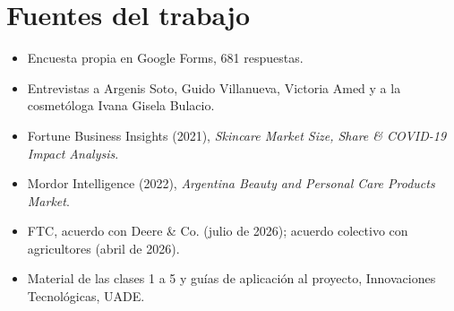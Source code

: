 \documentclass[11pt,a4paper]{article}
\begin{document}
\appendix
\section{Fuentes del trabajo}

\begin{itemize}
  \item Encuesta propia en Google Forms, 681 respuestas.
  \item Entrevistas a Argenis Soto, Guido Villanueva, Victoria Amed y a la cosmetóloga Ivana Gisela Bulacio.
  \item Fortune Business Insights (2021), \emph{Skincare Market Size, Share \& COVID-19 Impact Analysis}.
  \item Mordor Intelligence (2022), \emph{Argentina Beauty and Personal Care Products Market}.
  \item FTC, acuerdo con Deere \& Co. (julio de 2026); acuerdo colectivo con agricultores (abril de 2026).
  \item Material de las clases 1 a 5 y guías de aplicación al proyecto, Innovaciones Tecnológicas, UADE.
\end{itemize}
\end{document}
